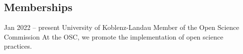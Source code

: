 \documentclass[10pt]{FreemanCV}
\begin{document}
\begin{paracol}{2}

\section{Memberships}

\jobentry
	{Jan 2022 -- present} 
	{}
	{University of Koblenz-Landau}
	{Member of the Open Science Commission}  
	{At the OSC, we promote the implementation of open science practices.}








	
	
	

\end{paracol}
\end{document}
